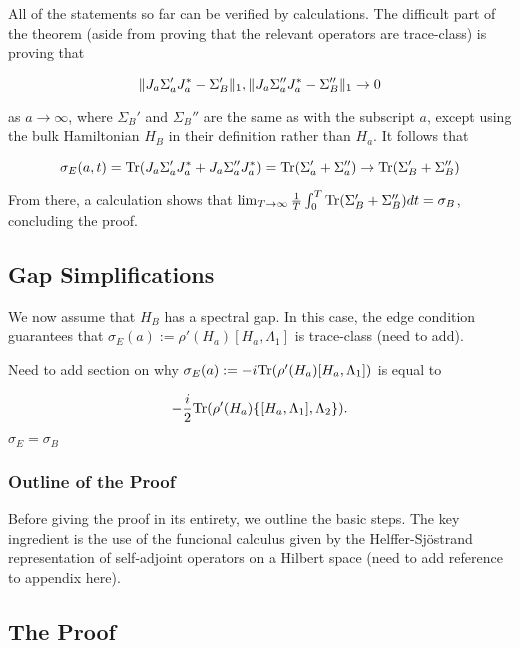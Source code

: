 \documentclass[12pt, letterpaper]{article}
\begin{document}
All of the statements so far can be verified by calculations. The difficult part of the theorem (aside from proving that the relevant operators are trace-class) is proving that

\[\lVert J_a\Sigma_a'J_a^* - \Sigma_B' \rVert_1, \lVert J_a\Sigma_a''J_a^* - \Sigma_B'' \rVert_1 \to 0\]

as $a\to\infty$, where $\Sigma_B'$ and $\Sigma_B''$ are the same as with the subscript $a$, except using the bulk Hamiltonian $H_B$ in their definition rather than $H_a$. It follows that 

\[\sigma_E(a,t) = \text{Tr}(J_a\Sigma_a'J_a^*+J_a\Sigma_a''J_a^*) = \text{Tr}(\Sigma_a'+\Sigma_a'') \to \text{Tr}(\Sigma_B'+\Sigma_B'')\]

From there, a calculation shows that $\lim_{T\to\infty}\frac{1}{T}\int_0^T\text{Tr}(\Sigma_B'+\Sigma_B'')dt = \sigma_B$, concluding the proof.

\subsection{Gap Simplifications}

We now assume that $H_B$ has a spectral gap. In this case, the edge condition guarantees that $\sigma_E(a) := \rho'(H_a)[H_a,\Lambda_1]$ is trace-class (need to add). 

Need to add section on why $\sigma_E(a) := -i\text{Tr}(\rho'(H_a)[H_a,\Lambda_1])$ is equal to

\[-\frac{i}{2}\text{Tr}(\rho'(H_a)\{[H_a,\Lambda_1],\Lambda_2\}).\]

\begin{theorem}
$\sigma_E = \sigma_B$
\end{theorem}

\subsubsection*{Outline of the Proof}

Before giving the proof in its entirety, we outline the basic steps. The key ingredient is the use of the funcional calculus given by the Helffer-Sj\"{o}strand representation of self-adjoint operators on a Hilbert space (need to add reference to appendix here).

\subsection*{The Proof}
\end{document}
